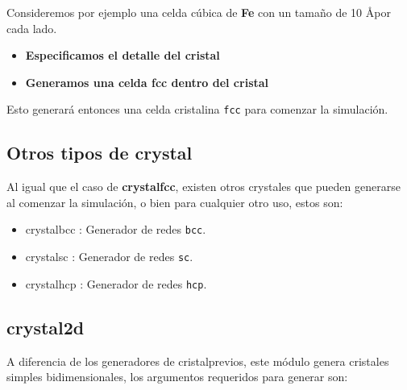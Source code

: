 
Consideremos por ejemplo una celda c\'ubica de \textbf{Fe} con un tama\~no de 10 \AA por cada lado.

\begin{itemize}
 \item \textbf{Especificamos el detalle del cristal}
 \item \textbf{Generamos una celda  fcc dentro del cristal}
\end{itemize}

Esto generar\'a entonces una celda cristalina \verb|fcc| para comenzar la simulaci\'on.

\subsection{Otros tipos de crystal}
Al igual que el caso de \textbf{crystalfcc}, existen otros crystales que pueden generarse al comenzar la simulaci\'on, o bien para cualquier otro uso, estos son:
\begin{itemize}
 \item crystalbcc : Generador de redes \verb|bcc|.
 \item crystalsc : Generador de redes \verb|sc|.
 \item crystalhcp : Generador de redes \verb|hcp|.
\end{itemize}

\subsection{crystal2d}
A diferencia de los generadores de cristalprevios, este m\'odulo genera cristales simples bidimensionales, los argumentos requeridos para generar son:


